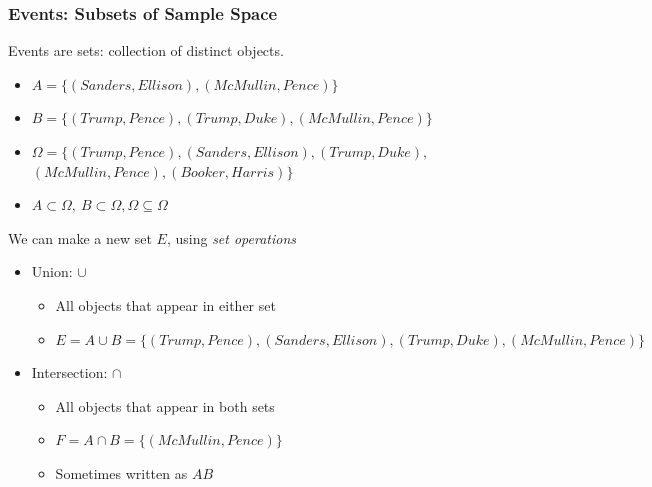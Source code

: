 \documentclass{beamer}
\numberwithin{equation}{section}
\begin{document}
\begin{frame}
\frametitle{Events: Subsets of Sample Space}

Events are \alert{sets}: collection of distinct objects.  \\
\begin{itemize}

\item[] $A = \{(Sanders, Ellison), (McMullin, Pence)\}$  \pause
\item[] $B  = \{ (Trump, Pence), (Trump, Duke), (McMullin, Pence)\} $ \pause
\item[] $\Omega = \{ (Trump, Pence), (Sanders, Ellison), (Trump, Duke),$\\ $(McMullin, Pence), (Booker, Harris) \}$\pause
\item[] $A\subset \Omega,\ B\subset \Omega, \Omega \subseteq \Omega$ \pause
\end{itemize}
We can make a new set $E$, using \emph{set operations} \pause
\begin{itemize}
\item[1)] Union: $\cup$  \pause
\begin{itemize}
\item[-] All objects that appear in \alert{either} set  \pause
\item[-] $E = A\cup B  = \{(Trump, Pence), (Sanders, Ellison), (Trump, Duke), (McMullin, Pence)\} $ \pause
\end{itemize}
\item[2)] Intersection: $\cap$  \pause
\begin{itemize}
\item[-] All objects that appear in \alert{both} sets  \pause
\item[-] $F= A\cap B = \{(McMullin, Pence)\} $ \pause
\item[-] Sometimes written as $AB$ 
\end{itemize}
\end{itemize}

\end{frame}
\end{document}
